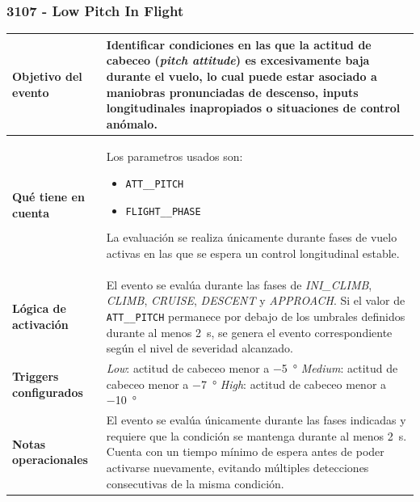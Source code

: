 \documentclass[11pt,a4paper]{article}
\begin{document}
	\subsubsection{3107 - Low Pitch In Flight}
	\begin{table}[H]
		\centering
		\renewcommand{\arraystretch}{1.3}
		\begin{tabular}{p{5cm} p{9.5cm}}
			\hline
			\textbf{Objetivo del evento} &
			Identificar condiciones en las que la actitud de cabeceo (\textit{pitch attitude}) es excesivamente baja durante el vuelo, lo cual puede estar asociado a maniobras pronunciadas de descenso, inputs longitudinales inapropiados o situaciones de control anómalo. \\
			\hline
			\textbf{Qué tiene en cuenta} & Los parametros usados son:
			\begin{itemize}
				\item \texttt{ATT\_\_PITCH}
				\item \texttt{FLIGHT\_\_PHASE}
			\end{itemize}
			La evaluación se realiza únicamente durante fases de vuelo activas en las que se espera un control longitudinal estable. \\
			\hline
			\textbf{Lógica de activación} &
			El evento se evalúa durante las fases de \textit{INI\_CLIMB}, \textit{CLIMB}, \textit{CRUISE}, \textit{DESCENT} y \textit{APPROACH}. Si el valor de \texttt{ATT\_\_PITCH} permanece por debajo de los umbrales definidos durante al menos \SI{2}{\second}, se genera el evento correspondiente según el nivel de severidad alcanzado. \\
			\hline
			\textbf{Triggers configurados} &
			\textit{Low}: actitud de cabeceo menor a \SI{-5}{\degree} \newline
			\textit{Medium}: actitud de cabeceo menor a \SI{-7}{\degree} \newline
			\textit{High}: actitud de cabeceo menor a \SI{-10}{\degree} \\
			\hline
			\textbf{Notas operacionales} &
			El evento se evalúa únicamente durante las fases indicadas y requiere que la condición se mantenga durante al menos \SI{2}{\second}. Cuenta con un tiempo mínimo de espera antes de poder activarse nuevamente, evitando múltiples detecciones consecutivas de la misma condición. \\
			\hline
		\end{tabular}
	\end{table}
\end{document}
